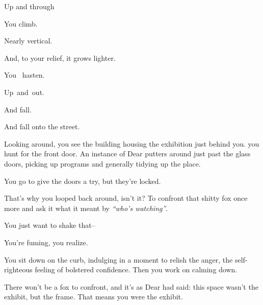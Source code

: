 Up and through

\null
\vfill

\newpage

\newpage

\null
\vspace{2in}

You climb.

\newpage

\null
\vspace{1.5in}

Nearly vertical.

\newpage

\null
\vspace{1in}

And, to your relief, it grows lighter.

\newpage

\null
\vspace{0.5in}

You {\large\ hasten.}

\newpage

{\large Up}{\Large\ and}{\LARGE\ out.}

\newpage

\null
\vfill

\begin{flushright}
  \footnotesize
  And fall.\hspace{1cm}\null
\end{flushright}


\newpage

And fall onto the street.

Looking around, you see the building housing the exhibition just behind you. you hunt for the front door. An instance of Dear putters around just past the glass doors, picking up programs and generally tidying up the place.

You go to give the doors a try, but they're locked.

That's why you looped back around, isn't it? To confront that shitty fox once more and ask it what it meant by \emph{``who's watching''}.

You just want to shake that--

You're fuming, you realize.

You sit down on the curb, indulging in a moment to relish the anger, the self-righteous feeling of bolstered confidence. Then you work on calming down.

There won't be a fox to confront, and it's as Dear had said: this space wasn't the exhibit, but the frame. That means you were the exhibit.

